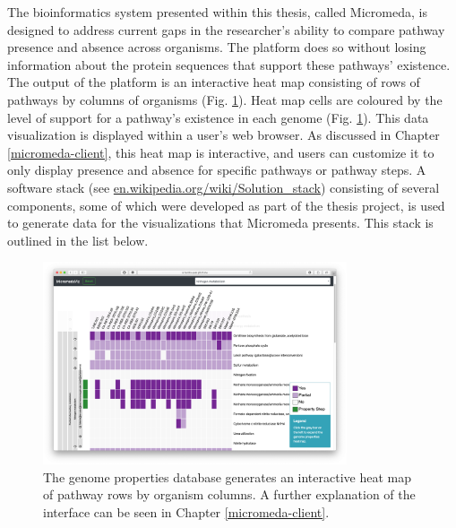 The bioinformatics system presented within this thesis, called Micromeda, is designed to address current gaps in the researcher's ability to compare pathway presence and absence across organisms. The platform does so without losing information about the protein sequences that support these pathways' existence. The output of the platform is an interactive heat map consisting of rows of pathways by columns of organisms (Fig. \ref{fig:basic-heatmap-overview}). Heat map cells are coloured by the level of support for a pathway's existence in each genome (Fig. \ref{fig:basic-heatmap-overview}). This data visualization is displayed within a user's web browser. As discussed in Chapter \ref{micromeda-client}, this heat map is interactive, and users can customize it to only display presence and absence for specific pathways or pathway steps. A software stack (see \href{en.wikipedia.org/wiki/Solution\_stack}{en.wikipedia.org/wiki/Solution\_stack}) consisting of several components, some of which were developed as part of the thesis project, is used to generate data for the visualizations that Micromeda presents. This stack is outlined in the list below.

\begin{figure}[!ht]
  \centering
	\includegraphics[width=0.8\textwidth]{media/Micromeda-Simple-Overview.png}
	 \caption{The genome properties database generates an interactive heat map of pathway rows by organism columns. A further explanation of the interface can be seen in Chapter \ref{micromeda-client}.}
	 \label{fig:basic-heatmap-overview}
\end{figure}

